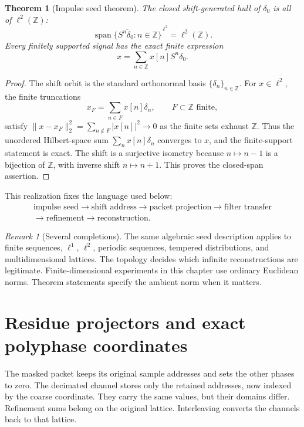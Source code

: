 \documentclass[11pt,letterpaper]{article}
\newtheorem{theorem}{Theorem}[section]
\theoremstyle{plain}
\theoremstyle{plain}
\theoremstyle{plain}
\theoremstyle{definition}
\theoremstyle{definition}
\theoremstyle{definition}
\theoremstyle{definition}
\theoremstyle{remark}
\newtheorem{remark}[remark]{Remark}
\theoremstyle{remark}
\theoremstyle{remark}
\theoremstyle{remark}
\newcommand{\bbZ}{\mathbb Z}
\begin{document}
\begin{theorem}[Impulse seed theorem]\label{result:01}
The closed shift-generated hull of $\delta_0$ is all of $\ell^2(\bbZ)$:
\[
\boxed{
\overline{\operatorname{span}\{S^n\delta_0:n\in\bbZ\}}^{\,\ell^2}
=\ell^2(\bbZ).
}
\]
Every finitely supported signal has the exact finite expression
\[
x=\sum_{n\in\bbZ}x[n]S^n\delta_0.
\]
\end{theorem}

\begin{proof}
The shift orbit is the standard orthonormal basis $\{\delta_n\}_{n\in\bbZ}$. For $x\in\ell^2$, the finite truncations
\[
x_F=\sum_{n\in F}x[n]\delta_n,\qquad F\subset\bbZ\text{ finite},
\]
satisfy $\|x-x_F\|_2^2=\sum_{n\notin F}|x[n]|^2\to0$ as the finite sets exhaust $\bbZ$. Thus the unordered Hilbert-space sum $\sum_nx[n]\delta_n$ converges to $x$, and the finite-support statement is exact. The shift is a surjective isometry because $n\mapsto n-1$ is a bijection of $\bbZ$, with inverse shift $n\mapsto n+1$. This proves the closed-span assertion.
\end{proof}

This realization fixes the language used below:
\[
\begin{gathered}
\text{impulse seed}\longrightarrow\text{shift address}\longrightarrow\text{packet projection}\longrightarrow\text{filter transfer}\\
\longrightarrow\text{refinement}\longrightarrow\text{reconstruction}.
\end{gathered}
\]

\begin{remark}[Several completions]\label{core:record:02}
The same algebraic seed description applies to finite sequences, $\ell^1$, $\ell^2$, periodic sequences, tempered distributions, and multidimensional lattices. The topology decides which infinite reconstructions are legitimate. Finite-dimensional experiments in this chapter use ordinary Euclidean norms. Theorem statements specify the ambient norm when it matters.
\end{remark}

\section{Residue projectors and exact polyphase coordinates}\label{core:section:02}

\begin{keyidea}[title={A packet has two useful representations}]
The masked packet keeps its original sample addresses and sets the other phases to zero. The decimated channel stores only the retained addresses, now indexed by the coarse coordinate. They carry the same values, but their domains differ. Refinement sums belong on the original lattice. Interleaving converts the channels back to that lattice.
\end{keyidea}
\end{document}
